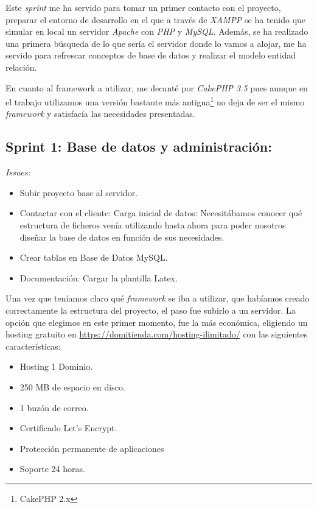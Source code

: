 Este \textit{sprint} me ha servido para tomar un primer contacto con el proyecto, preparar el entorno de desarrollo en el que a través de \textit{XAMPP} se ha tenido que simular en local un servidor \textit{Apache} con \textit{PHP} y \textit{MySQL}. Además, se ha realizado una primera búsqueda de lo que sería el servidor donde lo vamos a alojar, me ha servido para refrescar conceptos de base de datos y realizar el modelo entidad relación.

En cuanto al framework a utilizar, me decanté por \textit{CakePHP 3.5} pues aunque en el trabajo utilizamos una versión bastante más antigua\footnote{ CakePHP 2.x} no deja de ser el mismo \textit{framework} y satisfacía las necesidades presentadas.

\subsection{Sprint 1: Base de datos y administración:}

\textit{Issues:}
\begin{itemize}
	\item Subir proyecto base al servidor.
	\item Contactar con el cliente: Carga inicial de datos: Necesitábamos conocer qué estructura de ficheros venía utilizando hasta ahora para poder nosotros diseñar la base de datos en función de sus necesidades. 
	\item Crear tablas en Base de Datos MySQL.
	\item Documentación: Cargar la plantilla Latex.
\end{itemize}

Una vez que teníamos claro qué \textit{framework} se iba a utilizar, que habíamos creado correctamente la estructura del proyecto, el paso fue subirlo a un servidor. La opción que elegimos en este primer momento, fue la más económica, eligiendo un hosting gratuito en \url{https://domitienda.com/hosting-ilimitado/} con las siguientes características:

\begin{itemize}
	\item Hosting 1 Dominio.
	\item 250 MB de espacio en disco. 
	\item 1 buzón de correo.
	\item Certificado Let's Encrypt.
	\item Protección permanente de aplicaciones
	\item Soporte 24 horas.
\end{itemize}

